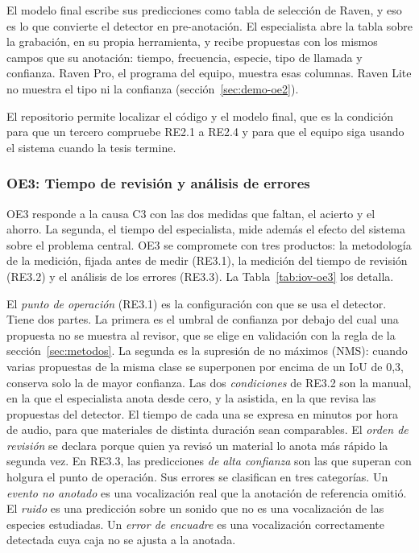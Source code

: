  El modelo final escribe sus predicciones como tabla de
selección de Raven, y eso es lo que convierte el detector en pre-anotación. El
especialista abre la tabla sobre la grabación, en su propia herramienta, y recibe
propuestas con los mismos campos que su anotación: tiempo, frecuencia, especie,
tipo de llamada y confianza. Raven Pro, el programa del equipo, muestra esas
columnas. Raven Lite no muestra el tipo ni la confianza
(sección~\ref{sec:demo-oe2}).

 El repositorio permite localizar el código y el modelo
final, que es la condición para que un tercero compruebe RE2.1 a RE2.4 y para que
el equipo siga usando el sistema cuando la tesis termine.

\subsubsection{OE3: Tiempo de revisión y análisis de errores}

OE3 responde a la causa C3 con las dos medidas que faltan, el acierto y el
ahorro. La segunda, el tiempo del especialista, mide además el efecto del sistema
sobre el problema central. OE3 se compromete con tres productos: la metodología de la medición,
fijada antes de medir (RE3.1), la medición del tiempo de revisión (RE3.2) y el
análisis de los errores (RE3.3). La Tabla~\ref{tab:iov-oe3} los detalla.

El \emph{punto de operación} (RE3.1) es la configuración con que se usa el
detector. Tiene dos partes. La primera es el umbral de confianza por debajo del
cual una propuesta no se muestra al revisor, que se elige en validación con la
regla de la sección~\ref{sec:metodos}. La segunda es la supresión de no máximos
(NMS): cuando varias propuestas de la misma clase se superponen por encima de un
IoU de 0,3, conserva solo la de mayor confianza. Las dos \emph{condiciones} de RE3.2 son la manual, en
la que el especialista anota desde cero, y la asistida, en la que revisa las
propuestas del detector. El tiempo de cada una se expresa en minutos por hora de
audio, para que materiales de distinta duración sean comparables. El \emph{orden
de revisión} se declara porque quien ya revisó un material lo anota más rápido la
segunda vez. En RE3.3, las predicciones \emph{de alta confianza} son las que
superan con holgura el punto de operación. Sus errores se clasifican en tres
categorías. Un \emph{evento no anotado} es una vocalización real que la anotación
de referencia omitió. El \emph{ruido} es una predicción sobre un sonido que no es
una vocalización de las especies estudiadas. Un \emph{error de encuadre} es una
vocalización correctamente detectada cuya caja no se ajusta a la anotada.

